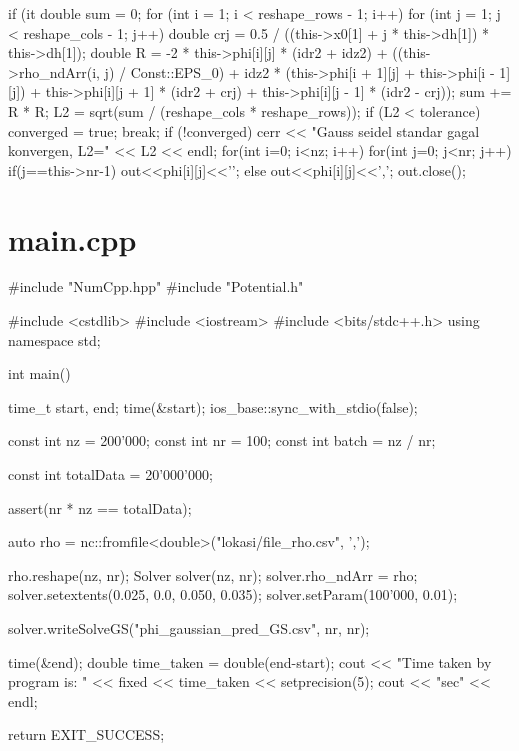 \begin{lampirancppcode}
{{{{            }
        }
        if (it %
        {
            double sum = 0;
            for (int i = 1; i < reshape_rows - 1; i++)
            {
                for (int j = 1; j < reshape_cols - 1; j++)
                {
                    double crj = 0.5 / ((this->x0[1] + j * this->dh[1]) * this->dh[1]);
                    double R = -2 * this->phi[i][j] * (idr2 + idz2) + ((this->rho_ndArr(i, j) / Const::EPS_0)
                            + idz2 * (this->phi[i + 1][j]
                            + this->phi[i - 1][j]) + this->phi[i][j + 1] * (idr2 + crj)
                            + this->phi[i][j - 1] * (idr2 - crj));
                    sum += R * R;
                }
            }
            L2 = sqrt(sum / (reshape_cols * reshape_rows));
            if (L2 < tolerance)
            {
                converged = true;
                break;
            }
        }
    }
    if (!converged)
    {
        cerr << "Gauss seidel standar gagal konvergen, L2=" << L2 << endl;
    }
    for(int i=0; i<nz; i++)
    {
        for(int j=0; j<nr; j++)
        {
            if(j==this->nr-1)
            {
                out<<phi[i][j]<<'\n';
            }
            else
            {
                out<<phi[i][j]<<',';
            }
        }
    }
    out.close();
}
\end{lampirancppcode}

\section{main.cpp}\label{kode_main_cpp}
\begin{lampirancppcode}
#include "NumCpp.hpp"
#include "Potential.h"

#include <cstdlib>
#include <iostream>
#include <bits/stdc++.h>
using namespace std;

int main()
{
    time_t start, end;
    time(&start);
    ios_base::sync_with_stdio(false);

    const int nz = 200'000;
    const int nr = 100;
    const int batch = nz / nr;

    const int totalData = 20'000'000;

    assert(nr * nz == totalData);

    auto rho = nc::fromfile<double>("lokasi/file_rho.csv", ',');

    rho.reshape(nz, nr);
    Solver solver(nz, nr);
    solver.rho_ndArr = rho;
    solver.setextents(0.025, 0.0, 0.050, 0.035);
    solver.setParam(100'000, 0.01);

    solver.writeSolveGS("phi_gaussian_pred_GS.csv", nr, nr);

    time(&end);
    double time_taken = double(end-start);
    cout << "Time taken by program is: " << fixed << time_taken << setprecision(5);
    cout << "sec" << endl;

    return EXIT_SUCCESS;
}
\end{lampirancppcode}

